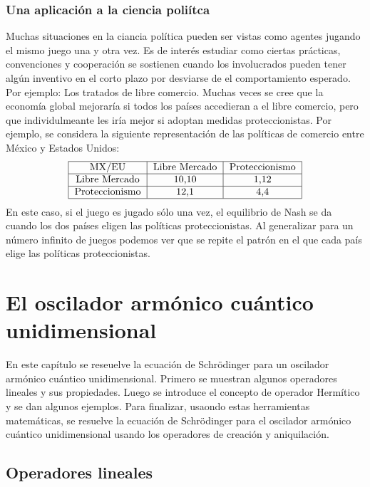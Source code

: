 \documentclass[letterpaper,12pt,oneside]{book}
\begin{document}
\subsection{Una aplicaci\'on a la ciencia poli\'itca}
Muchas situaciones en la ciancia pol\'itica pueden ser vistas como agentes jugando el mismo juego una y otra vez. Es de inter\'es estudiar como ciertas pr\'acticas, convenciones y cooperaci\'on se sostienen cuando los involucrados pueden tener alg\'un inventivo en el corto plazo por desviarse de el comportamiento esperado. Por ejemplo: Los tratados de libre comercio. Muchas veces se cree que la econom\'ia global mejorar\'ia si todos los pa\'ises accedieran a el libre comercio, pero que individulmeante les ir\'ia mejor si adoptan medidas proteccionistas. Por ejemplo, se considera la siguiente representaci\'on de las pol\'iticas de comercio entre M\'exico y Estados Unidos:
%
\begin{eqnarray}
    \begin{tabular}{ |c|c|c| } 
     \hline
     MX/EU & Libre Mercado & Proteccionismo \\ 
     \hline
     Libre Mercado & 10,10 & 1,12 \\ 
     \hline
     Proteccionismo & 12,1 & 4,4 \\ 
     \hline
    \end{tabular} 
\end{eqnarray}
%
En este caso, si el juego es jugado s\'olo una vez, el equilibrio de Nash se da cuando los dos pa\'ises eligen las pol\'iticas proteccionistas. Al generalizar para un n\'umero infinito de juegos podemos ver que se repite el patr\'on en el que cada pa\'is elige las pol\'iticas proteccionistas.





\chapter{El oscilador arm\'onico cu\'antico unidimensional}
%
En este cap\'itulo se reseuelve la ecuaci\'on de Schr\"odinger para un oscilador arm\'onico cu\'antico unidimensional. Primero se muestran algunos operadores lineales y sus propiedades. Luego se introduce el concepto de operador Herm\'itico y se dan algunos ejemplos. Para finalizar, usaondo estas herramientas matem\'aticas, se resuelve la ecuaci\'on de Schr\"odinger para el oscilador arm\'onico cu\'antico unidimensional usando los operadores de creaci\'on y aniquilaci\'on.


\section{Operadores lineales  }
\end{document}
